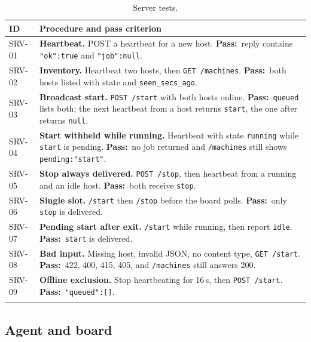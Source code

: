 \documentclass[11pt]{article}
\newcommand{\pass}{\textbf{Pass:}\ }
\begin{document}
\begin{longtable}{@{}p{}p{}@{}}
\toprule
\textbf{ID} & \textbf{Procedure and pass criterion} \\
\midrule
\endhead
SRV-01 & \textbf{Heartbeat.} POST a heartbeat for a new host. \pass reply contains \texttt{"ok":true} and \texttt{"job":null}. \\
SRV-02 & \textbf{Inventory.} Heartbeat two hosts, then \texttt{GET /machines}. \pass both hosts listed with state and \texttt{seen\_secs\_ago}. \\
SRV-03 & \textbf{Broadcast start.} \texttt{POST /start} with both hosts online. \pass \texttt{queued} lists both; the next heartbeat from a host returns \texttt{start}, the one after returns \texttt{null}. \\
SRV-04 & \textbf{Start withheld while running.} Heartbeat with state \texttt{running} while \texttt{start} is pending. \pass no job returned and \texttt{/machines} still shows \texttt{pending:"start"}. \\
SRV-05 & \textbf{Stop always delivered.} \texttt{POST /stop}, then heartbeat from a running and an idle host. \pass both receive \texttt{stop}. \\
SRV-06 & \textbf{Single slot.} \texttt{/start} then \texttt{/stop} before the board polls. \pass only \texttt{stop} is delivered. \\
SRV-07 & \textbf{Pending start after exit.} \texttt{/start} while running, then report \texttt{idle}. \pass \texttt{start} is delivered. \\
SRV-08 & \textbf{Bad input.} Missing host, invalid JSON, no content type, \texttt{GET /start}. \pass 422, 400, 415, 405, and \texttt{/machines} still answers 200. \\
SRV-09 & \textbf{Offline exclusion.} Stop heartbeating for 16\,s, then \texttt{POST /start}. \pass \texttt{"queued":[]}. \\
\bottomrule
\caption{Server tests.}\label{tab:srv}
\end{longtable}

\subsection{Agent and board}
\end{document}
